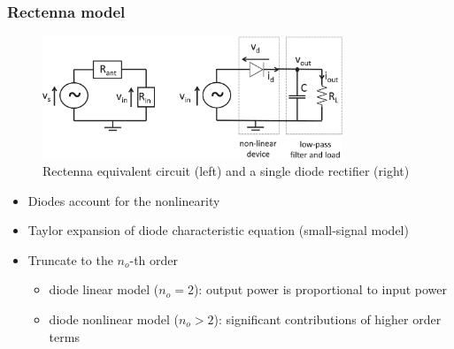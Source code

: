 \documentclass{beamer}
\begin{document}
\begin{frame}
\frametitle{Rectenna model}

\begin{figure}
  \centering
    \includegraphics[width=0.8\textwidth]{rectenna_circuit}
  \caption{Rectenna equivalent circuit (left) and a single diode rectifier (right) \cite{Clerckx2018a}}
  \label{fig:rectenna_circuit}
\end{figure}

\begin{itemize}
  \item Diodes account for the nonlinearity
  \item Taylor expansion of diode characteristic equation (small-signal model)
  \item Truncate to the ${n_o}$-th order
  \begin{itemize}
    \item diode linear model (${n_o} = 2$): output power is proportional to input power
    \item diode nonlinear model (${n_o} > 2$): significant contributions of higher order terms
  \end{itemize}
\end{itemize}

\end{frame}
\end{document}
